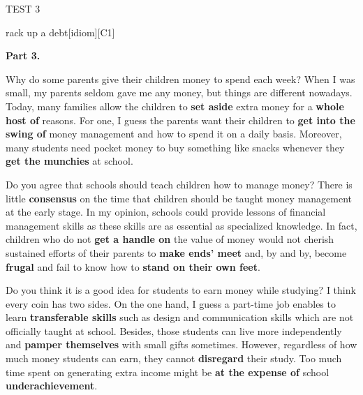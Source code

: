 \begin{glossarymc}[Cambridge 12]
\begin{test}{TEST 3}
\begin{VocabExplain}[Part 2]
            \begin{ExplainCard}{rack up a debt}[idiom][C1]
            \end{ExplainCard}
        \end{VocabExplain}

    \noindent
    \textbf{Part 3.}
    \begin{qa}{Why do some parents give their children money to spend each week?}
    When I was small, my parents seldom gave me any money, but things are different nowadays. Today, many families allow the children to \textbf{set aside} extra money for a \textbf{whole host of} reasons. For one, I guess the parents want their children to \textbf{get into the swing of} money management and how to spend it on a daily basis. Moreover, many students need pocket money to buy something like snacks whenever they \textbf{get the munchies} at school.
    \end{qa}

    \begin{qa}{Do you agree that schools should teach children how to manage money?}
    There is little \textbf{consensus} on the time that children should be taught money management at the early stage. In my opinion, schools could provide lessons of financial management skills as these skills are as essential as specialized knowledge. In fact, children who do not \textbf{get a handle on} the value of money would not cherish sustained efforts of their parents to \textbf{make ends’ meet} and, by and by, become \textbf{frugal} and fail to know how to \textbf{stand on their own feet}.
    \end{qa}

    \begin{qa}{Do you think it is a good idea for students to earn money while studying?}
    I think every coin has two sides. On the one hand, I guess a part-time job enables to learn \textbf{transferable skills} such as design and communication skills which are not officially taught at school. Besides, those students can live more independently and \textbf{pamper themselves} with small gifts sometimes. However, regardless of how much money students can earn, they cannot \textbf{disregard} their study. Too much time spent on generating extra income might be \textbf{at the expense of} school \textbf{underachievement}.
    \end{qa}


\end{test}
\end{glossarymc}
